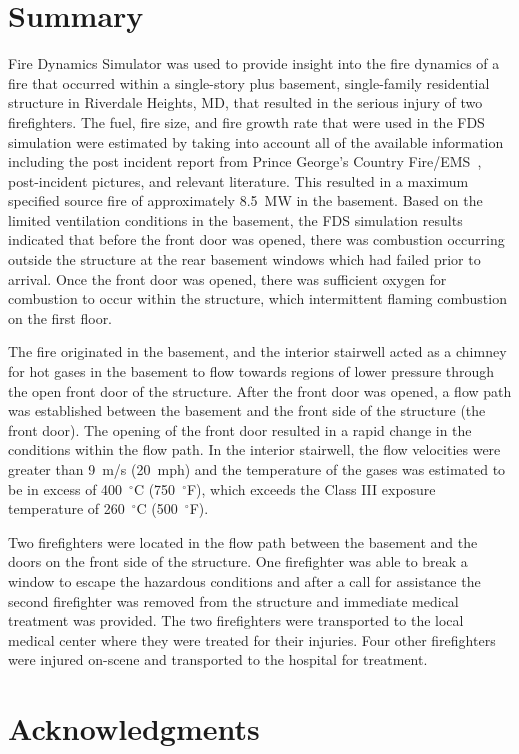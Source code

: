 \documentclass[12pt,oneside]{book}
\begin{document}
\chapter{Summary}
Fire Dynamics Simulator was used to provide insight into the fire dynamics of a fire that occurred within a single-story plus basement, single-family residential structure in Riverdale Heights, MD, that resulted in the serious injury of two firefighters. The fuel, fire size, and fire growth rate that were used in the FDS simulation were estimated by taking into account all of the available information including the post incident report from Prince George's Country Fire/EMS~\cite{PGCounty2013}, post-incident pictures, and relevant literature. This resulted in a maximum specified source fire of approximately 8.5~MW in the basement. Based on the limited ventilation conditions in the basement, the FDS simulation results indicated that before the front door was opened, there was combustion occurring outside the structure at the rear basement windows which had failed prior to arrival. Once the front door was opened, there was sufficient oxygen for combustion to occur within the structure, which intermittent flaming combustion on the first floor.

The fire originated in the basement, and the interior stairwell acted as a chimney for hot gases in the basement to flow towards regions of lower pressure through the open front door of the structure. After the front door was opened, a flow path was established between the basement and the front side of the structure (the front door). The opening of the front door resulted in a rapid change in the conditions within the flow path. In the interior stairwell, the flow velocities were greater than 9~m/s (20~mph) and the temperature of the gases was estimated to be in excess of 400~$^{\circ}$C (750~$^{\circ}$F), which exceeds the Class III exposure temperature of 260~$^{\circ}$C (500~$^{\circ}$F).

Two firefighters were located in the flow path between the basement and the doors on the front side of the structure. One firefighter was able to break a window to escape the hazardous conditions and after a call for assistance the second firefighter was removed from the structure and immediate medical treatment was provided. The two firefighters were transported to the local medical center where they were treated for their injuries. Four other firefighters were injured on-scene and transported to the hospital for treatment.

\chapter{Acknowledgments}
\end{document}
